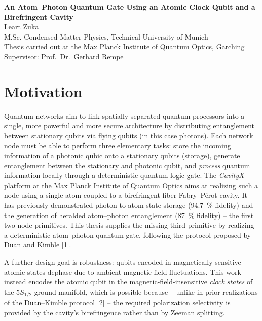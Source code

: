 \documentclass[10pt,a4paper]{article}
\begin{document}
\begin{center}
	{\LARGE\bfseries An Atom--Photon Quantum Gate Using an Atomic Clock Qubit and a Birefringent Cavity}\\[0.6em]
	{\large Leart Zuka}\\[0.15em]
	{\small M.Sc. Condensed Matter Physics, Technical University of Munich\\
	Thesis carried out at the Max Planck Institute of Quantum Optics, Garching\\
	Supervisor: Prof.\ Dr.\ Gerhard Rempe}
\end{center}

\vspace{0.3em}

\section*{Motivation}

Quantum networks aim to link spatially separated quantum processors into a single, more powerful and more secure architecture by distributing entanglement between stationary qubits via flying qubits (in this case photons). Each network node must be able to perform three elementary tasks: store the incoming information of a photonic qubic onto a stationary qubits (storage), generate entanglement between the stationary and photonic qubit, and \emph{process} quantum information locally through a deterministic quantum logic gate. The \textit{CavityX} platform at the Max Planck Institute of Quantum Optics aims at realizing such a node using a single  atom coupled to a birefringent fiber Fabry--P\'erot cavity. It has previously demonstrated photon-to-atom state storage (\SI{94.7}{\percent} fidelity) and the generation of heralded atom--photon entanglement (\SI{87}{\percent} fidelity) -- the first two node primitives. This thesis supplies the missing third primitive by realizing a deterministic atom--photon quantum gate, following the protocol proposed by Duan and Kimble [1].

A further design goal is robustness: qubits encoded in magnetically sensitive atomic states dephase due to ambient magnetic field fluctuations. This work instead encodes the atomic qubit in the magnetic-field-insensitive \emph{clock states} of the  $5S_{1/2}$ ground manifold, which is possible because -- unlike in prior realizations of the Duan--Kimble protocol [2] -- the required polarization selectivity is provided by the cavity's birefringence rather than by Zeeman splitting.
\end{document}
